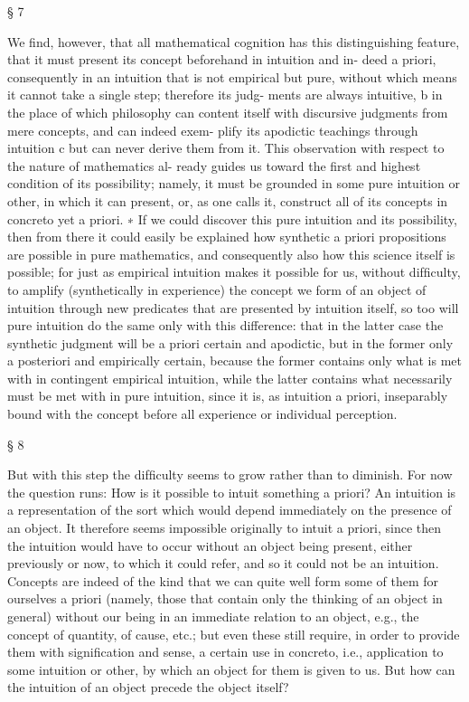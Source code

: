 § 7

We ﬁnd, however, that all mathematical cognition has this distinguishing
feature, that it must present its concept beforehand in intuition and in-
deed a priori, consequently in an intuition that is not empirical but pure,
without which means it cannot take a single step; therefore its judg-
ments are always intuitive, b in the place of which philosophy can content
itself with discursive judgments from mere concepts, and can indeed exem-
plify its apodictic teachings through intuition c but can never derive them
from it. This observation with respect to the nature of mathematics al-
ready guides us toward the ﬁrst and highest condition of its possibility;
namely, it must be grounded in some pure intuition or other, in which it
can present, or, as one calls it, construct all of its concepts in concreto yet
a priori. ∗ If we could discover this pure intuition and its possibility, then
from there it could easily be explained how synthetic a priori propositions
are possible in pure mathematics, and consequently also how this science
itself is possible; for just as empirical intuition makes it possible for us,
without difﬁculty, to amplify (synthetically in experience) the concept we
form of an object of intuition through new predicates that are presented
by intuition itself, so too will pure intuition do the same only with this
difference: that in the latter case the synthetic judgment will be a priori
certain and apodictic, but in the former only a posteriori and empirically
certain, because the former contains only what is met with in contingent
empirical intuition, while the latter contains what necessarily must be
met with in pure intuition, since it is, as intuition a priori, inseparably
bound with the concept before all experience or individual perception.

§ 8

But with this step the difﬁculty seems to grow rather than to diminish.
For now the question runs: How is it possible to intuit something a priori? An
intuition is a representation of the sort which would depend immediately
on the presence of an object. It therefore seems impossible originally to
intuit a priori, since then the intuition would have to occur without an
object being present, either previously or now, to which it could refer,
and so it could not be an intuition. Concepts are indeed of the kind that
we can quite well form some of them for ourselves a priori (namely, those
that contain only the thinking of an object in general) without our being
in an immediate relation to an object, e.g., the concept of quantity, of
cause, etc.; but even these still require, in order to provide them with
signiﬁcation and sense, a certain use in concreto, i.e., application to some
intuition or other, by which an object for them is given to us. But how
can the intuition of an object precede the object itself?

